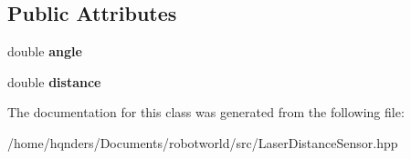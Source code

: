 \subsection*{Public Attributes}
\begin{DoxyCompactItemize}
\item 
double {\bfseries angle}\hypertarget{class_model_1_1_distance_percept_a8e4a64e9c3844e42a211a0aa945f7998}{}\label{class_model_1_1_distance_percept_a8e4a64e9c3844e42a211a0aa945f7998}

\item 
double {\bfseries distance}\hypertarget{class_model_1_1_distance_percept_a83e7312e3ed47d97c6bfc41b9e0c0e4a}{}\label{class_model_1_1_distance_percept_a83e7312e3ed47d97c6bfc41b9e0c0e4a}

\end{DoxyCompactItemize}


The documentation for this class was generated from the following file\+:\begin{DoxyCompactItemize}
\item 
/home/hqnders/\+Documents/robotworld/src/Laser\+Distance\+Sensor.\+hpp\end{DoxyCompactItemize}
